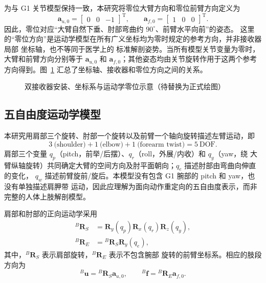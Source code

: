 为与 G1 关节模型保持一致，本研究将零位大臂方向和零位前臂方向定义为
\begin{equation}
  \boldsymbol a_{u,0}=\begin{bmatrix}0&0&-1\end{bmatrix}^{\mathrm T},
  \qquad
  \boldsymbol a_{f,0}=\begin{bmatrix}1&0&0\end{bmatrix}^{\mathrm T}.
  \label{eq:ch4_zero_segment_axes}
\end{equation}
因此，零位对应“大臂自然下垂、肘部弯曲约 $90^\circ$、前臂水平向前”的姿态。
这里的“零位方向”是运动学模型在所有广义坐标均为零时规定的参考方向，并非接收器局部
坐标轴，也不等同于医学上的
标准解剖姿势。当所有模型关节变量为零时，大臂和前臂方向分别等于
$\boldsymbol a_{u,0}$ 和 $\boldsymbol a_{f,0}$；其他姿态均由关节旋转作用于这两个参考
方向得到。图~\ref{fig:ch4_frames_zero_pose} 汇总了坐标轴、接收器和零位方向之间的关系。

\begin{figure}[htbp]
  \centering
  \caption{双接收器安装、坐标系与运动学零位示意（待替换为正式绘图）}
  \label{fig:ch4_frames_zero_pose}
\end{figure}

\subsection{五自由度运动学模型}
\label{subsec:ch4_five_dof_model}

本研究用肩部三个旋转、肘部一个旋转以及前臂一个轴向旋转描述左臂运动，即
\begin{equation}
  3\ \text{(shoulder)}+1\ \text{(elbow)}+1\ \text{(forearm twist)}
  =5\ \text{DOF}.
  \label{eq:ch4_five_dof_count}
\end{equation}
肩部三个变量 $q_p$（pitch，前举/后摆）、$q_r$（roll，外展/内收）和 $q_y$（yaw，绕
大臂纵轴旋转）共同确定大臂的空间方向及肘平面朝向；$q_e$ 描述肘部由弯曲向伸直的变化，
$q_w$ 描述前臂旋前/旋后。本模型没有包含 G1 腕部的 pitch 和 yaw，也没有单独描述肩胛带
运动，因此应理解为面向动作重定向的五自由度表示，而非完整的人体上肢解剖模型。

肩部和肘部的正向运动学采用
\begin{align}
  {}^{B}\boldsymbol R_S
  &=\boldsymbol R_y(q_p)\boldsymbol R_x(q_r)\boldsymbol R_z(q_y),
  \label{eq:ch4_shoulder_rotation}\\
  {}^{B}\boldsymbol R_E
  &={}^B\boldsymbol R_S\boldsymbol R_y(q_e),
  \label{eq:ch4_forearm_rotation}
\end{align}
其中，${}^{B}\boldsymbol R_S$ 表示肩部旋转，${}^{B}\boldsymbol R_E$ 表示不包含腕部
旋转的前臂坐标系。相应的肢段方向为
\begin{equation}
  {}^{B}\boldsymbol u={}^B\boldsymbol R_S\boldsymbol a_{u,0},
  \qquad
  {}^{B}\boldsymbol f={}^B\boldsymbol R_E\boldsymbol a_{f,0}.
  \label{eq:ch4_segment_directions}
\end{equation}

